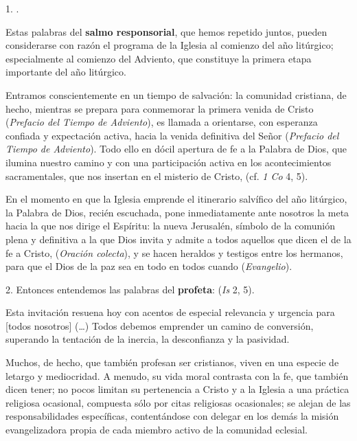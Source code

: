 \begin{body}
	1. .
	
	Estas palabras del \textbf{salmo responsorial}, que hemos repetido juntos, pueden considerarse con razón el programa de la Iglesia al comienzo del año litúrgico; especialmente al comienzo del Adviento, que constituye la primera etapa importante del año litúrgico.
	
	Entramos conscientemente en un tiempo  de salvación: la comunidad cristiana, de hecho, mientras se prepara para conmemorar la primera venida de Cristo  (\emph{Prefacio del Tiempo de Adviento}), es llamada a orientarse, con esperanza confiada y expectación activa, hacia la venida definitiva del Señor  (\emph{Prefacio del Tiempo de Adviento}). Todo ello en dócil apertura de fe a la Palabra de Dios, que ilumina nuestro camino y con una participación activa en los acontecimientos sacramentales, que nos insertan en el misterio de Cristo,  (cf. \emph{1 Co} 4, 5).
	
	En el momento en que la Iglesia emprende el itinerario salvífico del año litúrgico, la Palabra de Dios, recién escuchada, pone inmediatamente ante nosotros la meta hacia la que nos dirige el Espíritu: la nueva Jerusalén, símbolo de la comunión plena y definitiva a la que Dios invita y admite a todos aquellos que dicen el  de la fe a Cristo,  (\emph{Oración colecta}), y se hacen heraldos y testigos entre los hermanos, para que el Dios de la paz sea en todo en todos cuando  (\emph{Evangelio}).
	
	2. Entonces entendemos las palabras del \textbf{profeta}:  (\emph{Is} 2, 5).
	
	Esta invitación resuena hoy con acentos de especial relevancia y urgencia para {[}todos nosotros{]} (\ldots{}) Todos debemos emprender un camino de conversión, superando la tentación de la inercia, la desconfianza y la pasividad.
	
	Muchos, de hecho, que también profesan ser cristianos, viven en una especie de letargo y mediocridad. A menudo, su vida moral contrasta con la fe, que también dicen tener; no pocos limitan su pertenencia a Cristo y a la Iglesia a una práctica religiosa ocasional, compuesta sólo por citas religiosas ocasionales; se alejan de las responsabilidades específicas, contentándose con delegar en los demás la misión evangelizadora propia de cada miembro activo de la comunidad eclesial.
	

\end{body}
